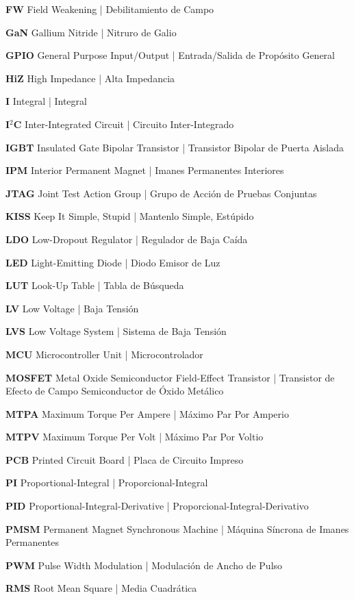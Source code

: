\textbf{FW} Field Weakening | Debilitamiento de Campo

\textbf{GaN} Gallium Nitride | Nitruro de Galio

\textbf{GPIO} General Purpose Input/Output | Entrada/Salida de Propósito General

\textbf{HiZ} High Impedance | Alta Impedancia

\textbf{I} Integral | Integral

\textbf{I$^2$C} Inter-Integrated Circuit | Circuito Inter-Integrado

\textbf{IGBT} Insulated Gate Bipolar Transistor | Transistor Bipolar de Puerta Aislada

\textbf{IPM} Interior Permanent Magnet | Imanes Permanentes Interiores

\textbf{JTAG} Joint Test Action Group | Grupo de Acción de Pruebas Conjuntas

\textbf{KISS} Keep It Simple, Stupid | Mantenlo Simple, Estúpido

\textbf{LDO} Low-Dropout Regulator | Regulador de Baja Caída

\textbf{LED} Light-Emitting Diode | Diodo Emisor de Luz

\textbf{LUT} Look-Up Table | Tabla de Búsqueda

\textbf{LV} Low Voltage | Baja Tensión

\textbf{LVS} Low Voltage System | Sistema de Baja Tensión

\textbf{MCU} Microcontroller Unit | Microcontrolador

\textbf{MOSFET} Metal Oxide Semiconductor Field-Effect Transistor | Transistor de Efecto de Campo Semiconductor de Óxido Metálico

\textbf{MTPA} Maximum Torque Per Ampere | Máximo Par Por Amperio

\textbf{MTPV} Maximum Torque Per Volt | Máximo Par Por Voltio

\textbf{PCB} Printed Circuit Board | Placa de Circuito Impreso

\textbf{PI} Proportional-Integral | Proporcional-Integral

\textbf{PID} Proportional-Integral-Derivative | Proporcional-Integral-Derivativo

\textbf{PMSM} Permanent Magnet Synchronous Machine | Máquina Síncrona de Imanes Permanentes

\textbf{PWM} Pulse Width Modulation | Modulación de Ancho de Pulso

\textbf{RMS} Root Mean Square | Media Cuadrática

